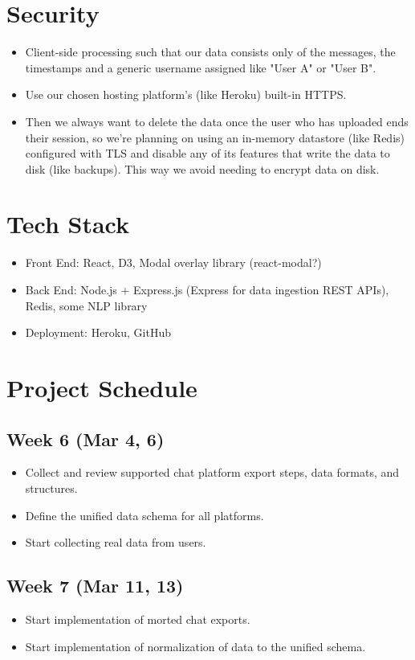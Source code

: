 \documentclass{article}\usepackage{graphicx}
\begin{document}
\section*{Security}
\begin{itemize}
    \item Client-side processing such that our data consists only of the messages, the timestamps and a generic username assigned like "User A" or "User B".
    \item Use our chosen hosting platform's (like Heroku) built-in HTTPS.
    \item Then we always want to delete the data once the user who has uploaded ends their session, so we're planning on using an in-memory datastore (like Redis) configured with TLS and disable any of its features that write the data to disk (like backups). This way we avoid needing to encrypt data on disk.
\end{itemize}

\section*{Tech Stack}
\begin{itemize}
    \item Front End: React, D3, Modal overlay library (react-modal?)
    \item Back End: Node.js + Express.js (Express for data ingestion REST APIs), Redis, some NLP library
    \item Deployment: Heroku, GitHub
\end{itemize}

\section*{Project Schedule}
\subsection*{Week 6 (Mar 4, 6)}
\begin{itemize}
    \item Collect and review supported chat platform export steps, data formats, and structures.
    \item Define the unified data schema for all platforms.
    \item Start collecting real data from users.
\end{itemize}

\subsection*{Week 7 (Mar 11, 13)}
\begin{itemize}
    \item Start implementation of morted chat exports.
    \item Start implementation of normalization of data to the unified schema.
\end{itemize}
\end{document}
